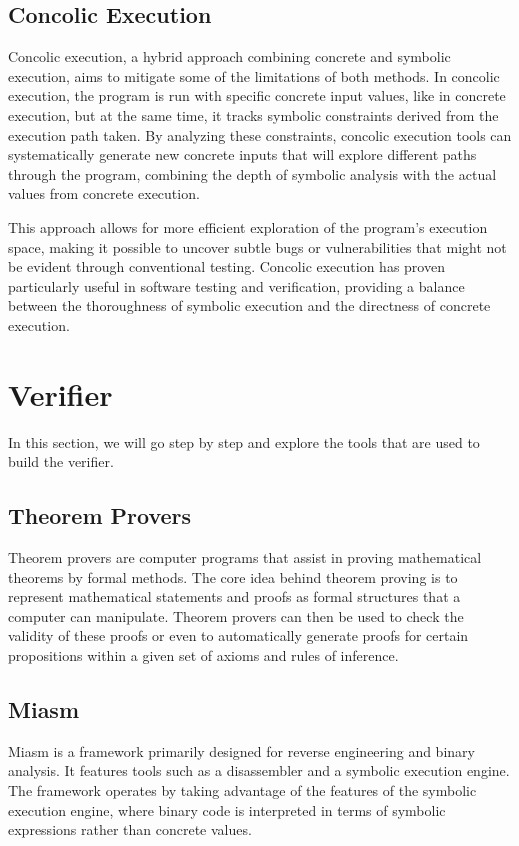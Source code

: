\subsection{Concolic Execution} 
Concolic execution, a hybrid approach combining concrete and symbolic execution, aims to mitigate some of the limitations of both methods. 
In concolic execution, the program is run with specific concrete input values, like in concrete execution, but at the same time, it tracks symbolic constraints derived from the execution path taken. 
By analyzing these constraints, concolic execution tools can systematically generate new concrete inputs that will explore different paths through the program, combining the depth of symbolic analysis with the actual values from concrete execution.

This approach allows for more efficient exploration of the program's execution space, making it possible to uncover subtle bugs or vulnerabilities that might not be evident through conventional testing. 
Concolic execution has proven particularly useful in software testing and verification, providing a balance between the thoroughness of symbolic execution and the directness of concrete execution.

\section{Verifier}
In this section, we will go step by step and explore the tools that are used to build the verifier.

\subsection{Theorem Provers}
Theorem provers are computer programs that assist in proving mathematical theorems by formal methods.
The core idea behind theorem proving is to represent mathematical statements and proofs as formal structures that a computer can manipulate.
Theorem provers can then be used to check the validity of these proofs or even to automatically generate proofs for certain propositions within a given set of axioms and rules of inference.

\subsection{Miasm}
Miasm \cite{desclaux2012miasm} is a framework primarily designed for reverse engineering and binary analysis.
It features tools such as a disassembler and a symbolic execution engine.
The framework operates by taking advantage of the features of the symbolic execution engine, where binary code is interpreted in terms of symbolic expressions rather than concrete values.

